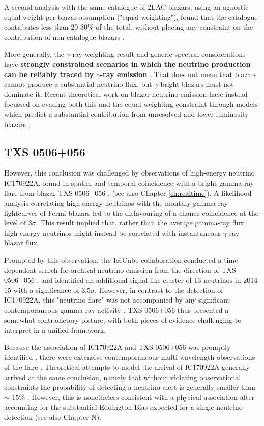  A second analysis with the same catalogue of 2LAC blazars, using an agnostic equal-weight-per-blazar assumption ("equal weighting"), found that the catalogue contributes less than 20-30\% of the total, without placing any constraint on the contribution of non-catalogue blazars \cite{ic_blazar_17}. 
 
 More generally, the $\gamma$-ray weighting result and generic spectral considerations have \textbf{strongly constrained scenarios in which the neutrino production can be reliably traced by $\gamma$-ray emission} . That does not mean that blazars cannot produce a substantial neutrino flux, but $\gamma$-bright blazars must not dominate it. Recent theoretical work on blazar neutrino emission have instead focussed on evading both this and the equal-weighting constraint through models which predict a substantial contribution from unresolved and lower-luminosity blazars .
 
 \subsection{TXS 0506+056}
 
 However, this conclusion was challenged by observations of high-energy neutrino IC170922A, found in spatial and temporal coincidence with a bright gamma-ray flare from blazar TXS 0506+056 , (see also Chapter \ref{ch:realtime}). A likelihood analysis correlating high-energy neutrinos with the monthly gamma-ray lightcurves of Fermi blazars led to the disfavouring of a chance coincidence at the level of $3 \sigma$. This result implied that, rather than the average gamma-ray flux, high-energy neutrinos might instead be correlated with instantaneous $\gamma$-ray blazar flux. 
 
 Prompted by this observation, the IceCube collaboration conducted a time-dependent search for archival neutrino emission from the direction of TXS 0506+056 , and identified an additional signal-like cluster of 13 neutrinos in 2014-15 with a significance of $3.5 \sigma$. However, in contrast to the detection of IC170922A, this "neutrino flare" was not accompanied by any significant contemporaneous gamma-ray activity . TXS 0506+056 thus presented a somewhat contradictory picture, with both pieces of evidence challenging to interpret in a unified framework. 
 
Because the association of IC170922A and TXS 0506+056 was promptly identified , there were extensive contemporaneous multi-wavelength observations of the flare \cite{2018Sci...361.1378I}. Theoretical attempts to model the arrival of IC170922A generally arrived at the same conclusion, namely that without violating observational constraints the probability of detecting a neutrino alert is generally smaller than $\sim$ 15\% . However, this is nonetheless consistent with a physical association after accounting for the substantial Eddington Bias expected for a single neutrino detection  (see also Chapter N).
 
